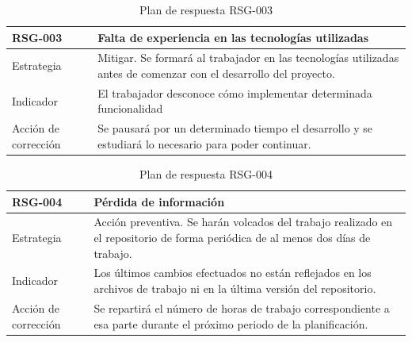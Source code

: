 \begin{table}[htpb]
\centering
\begin{tabularx}{\textwidth}{|l|X|}
\hline
\textbf{RSG-003}              & \textbf{Falta de experiencia en las tecnologías utilizadas}                                                                \\ \hline
Estrategia & Mitigar. Se formará al trabajador en las tecnologías utilizadas antes de comenzar con el desarrollo del proyecto. \\ \hline
Indicador            & El trabajador desconoce cómo implementar determinada funcionalidad                                                \\ \hline
Acción de corrección & Se pausará por un determinado tiempo el desarrollo y se estudiará lo necesario para poder continuar.              \\ \hline
\end{tabularx}
\caption{Plan de respuesta RSG-003}
\end{table}


\begin{table}[htpb]
\centering
\begin{tabularx}{\textwidth}{|l|X|}
\hline
\textbf{RSG-004}              & \textbf{Pérdida de información}                                                                                                  \\ \hline
Estrategia & Acción preventiva. Se harán volcados del trabajo realizado en el repositorio de forma periódica de al menos dos días de trabajo.  \\ \hline
Indicador            & Los últimos cambios efectuados no están reflejados en los archivos de trabajo ni en la última versión del repositorio. \\ \hline
Acción de corrección & Se repartirá el número de horas de trabajo correspondiente a esa parte durante el próximo periodo de la planificación.  \\ \hline
\end{tabularx}
\caption{Plan de respuesta RSG-004}
\end{table}


